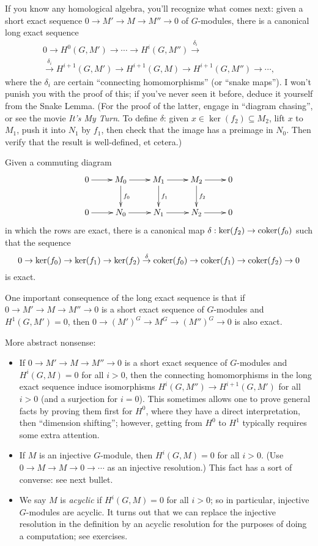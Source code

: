 If you know any homological algebra, you'll recognize what comes next:
given a short exact sequence $0 \to M' \to M \to M'' \to 0$ of $G$-modules,
there is a canonical long exact sequence
\begin{gather*}
0 \to H^0(G, M') \to \cdots \to H^i(G, M'') \stackrel{\delta_i}{\to}
\\
\stackrel{\delta_i}{\to} H^{i+1}(G, M') \to H^{i+1}(G, M) \to H^{i+1}(G,M'') \to \cdots,
\end{gather*}
where the $\delta_i$ are certain ``connecting homomorphisms'' (or ``snake
maps''). I won't punish you with the proof of this; if you've never seen
it before, deduce it yourself from the Snake Lemma. (For the proof of the
latter, engage in ``diagram chasing'', or see the movie \emph{It's My Turn}.
To define $\delta$: given $x \in \ker(f_2) \subseteq M_2$, lift $x$ to
$M_1$, push it into $N_1$ by $f_1$, then check that the image has
a preimage in $N_0$. Then verify that the result is well-defined, et
cetera.)
\begin{lemma} \label{L:snake lemma}
Given a commuting diagram
\[
\xymatrix{
0 \ar[r] & M_0 \ar[r] \ar^{f_0}[d] & M_1 \ar[r] \ar^{f_1}[d] & M_2 \ar[r] \ar^{f_2}[d]
& 0 \\
0 \ar[r] & N_0 \ar[r] & N_1 \ar[r] & N_2 \ar[r] & 0
}
\]
in which the rows are exact, there is a canonical map $\delta:
\ker(f_2) \to \operatorname{coker}(f_0)$ such that
the sequence
\[
0 \to \ker(f_0) \to \ker(f_1) \to \ker(f_2) \stackrel{\delta}{\to}
\operatorname{coker}(f_0) \to \operatorname{coker}(f_1) \to \operatorname{coker}(f_2) \to 0
\]
is exact.
\end{lemma}
One important consequence of the long exact sequence is that if
$0 \to M' \to M \to M'' \to 0$ is a short exact sequence of $G$-modules
and $H^1(G, M') = 0$, then $0 \to (M')^G \to M^G \to (M'')^G \to 0$ is
also exact.

More abstract nonsense:
\begin{itemize}
\item
If $0 \to M' \to M \to M'' \to 0$ is a short exact sequence of $G$-modules
and $H^i(G, M) = 0$ for all $i>0$, then the connecting homomorphisms
in the long exact sequence induce isomorphisms $H^i(G, M'') \to
H^{i+1}(G, M')$ for all $i > 0$ (and a surjection for $i=0$). This sometimes allows one to prove
general facts by proving them first for $H^0$, where they have a direct
interpretation, then ``dimension shifting''; however, getting from $H^0$ to $H^1$ typically requires some extra attention.
\item If $M$ is an injective $G$-module, then $H^i(G,M) = 0$ for all 
$i>0$. (Use $0 \to M \to M \to 0 \to \cdots$ as an injective resolution.)
This fact has a sort of converse: see next bullet.
\item We say $M$ is \emph{acyclic} if $H^i(G,M) =0$ for all $i>0$;
so in particular, injective $G$-modules are acyclic.
It turns out that we 
can replace the injective resolution in the definition by an acyclic resolution
for the purposes of doing a computation; see exercises.
\end{itemize}

